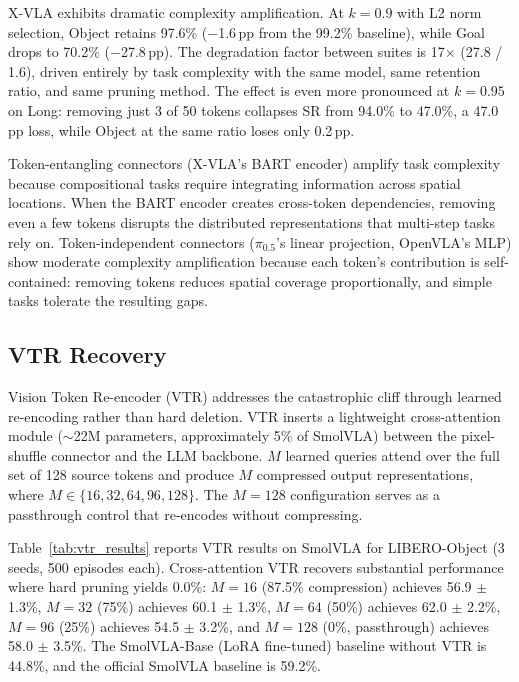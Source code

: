 X-VLA exhibits dramatic complexity amplification. At $k{=}0.9$ with L2 norm selection, Object retains 97.6\% ($-$1.6\,pp from the 99.2\% baseline), while Goal drops to 70.2\% ($-$27.8\,pp). The degradation factor between suites is 17$\times$ (27.8 / 1.6), driven entirely by task complexity with the same model, same retention ratio, and same pruning method. The effect is even more pronounced at $k{=}0.95$ on Long: removing just 3 of 50 tokens collapses SR from 94.0\% to 47.0\%, a 47.0\,pp loss, while Object at the same ratio loses only 0.2\,pp.

Token-entangling connectors (X-VLA's BART encoder) amplify task complexity because compositional tasks require integrating information across spatial locations. When the BART encoder creates cross-token dependencies, removing even a few tokens disrupts the distributed representations that multi-step tasks rely on. Token-independent connectors ($\pi_0.5$'s linear projection, OpenVLA's MLP) show moderate complexity amplification because each token's contribution is self-contained: removing tokens reduces spatial coverage proportionally, and simple tasks tolerate the resulting gaps.

\subsection{VTR Recovery}
\label{sec:vtr_recovery}

Vision Token Re-encoder (VTR) addresses the catastrophic cliff through learned re-encoding rather than hard deletion. VTR inserts a lightweight cross-attention module ($\sim$22M parameters, approximately 5\% of SmolVLA) between the pixel-shuffle connector and the LLM backbone. $M$ learned queries attend over the full set of 128 source tokens and produce $M$ compressed output representations, where $M \in \{16, 32, 64, 96, 128\}$. The $M{=}128$ configuration serves as a passthrough control that re-encodes without compressing.

Table~\ref{tab:vtr_results} reports VTR results on SmolVLA for LIBERO-Object (3 seeds, 500 episodes each). Cross-attention VTR recovers substantial performance where hard pruning yields 0.0\%: $M{=}16$ (87.5\% compression) achieves 56.9 $\pm$ 1.3\%, $M{=}32$ (75\%) achieves 60.1 $\pm$ 1.3\%, $M{=}64$ (50\%) achieves 62.0 $\pm$ 2.2\%, $M{=}96$ (25\%) achieves 54.5 $\pm$ 3.2\%, and $M{=}128$ (0\%, passthrough) achieves 58.0 $\pm$ 3.5\%. The SmolVLA-Base (LoRA fine-tuned) baseline without VTR is 44.8\%, and the official SmolVLA baseline is 59.2\%.

